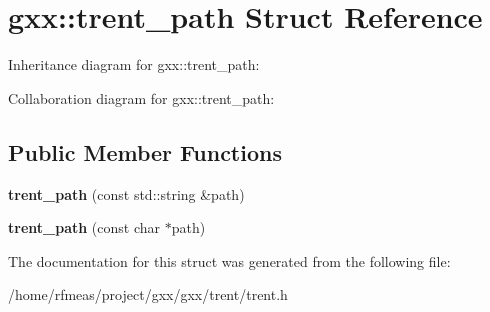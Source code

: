 \hypertarget{structgxx_1_1trent__path}{}\section{gxx\+:\+:trent\+\_\+path Struct Reference}
\label{structgxx_1_1trent__path}


Inheritance diagram for gxx\+:\+:trent\+\_\+path\+:


Collaboration diagram for gxx\+:\+:trent\+\_\+path\+:
\subsection*{Public Member Functions}
\begin{DoxyCompactItemize}
\item 
{\bfseries trent\+\_\+path} (const std\+::string \&path)\hypertarget{structgxx_1_1trent__path_a9588bdc54d56b3c5b96a43af16f724fa}{}\label{structgxx_1_1trent__path_a9588bdc54d56b3c5b96a43af16f724fa}

\item 
{\bfseries trent\+\_\+path} (const char $\ast$path)\hypertarget{structgxx_1_1trent__path_a2116856641019d321a8f0527ca8b5919}{}\label{structgxx_1_1trent__path_a2116856641019d321a8f0527ca8b5919}

\end{DoxyCompactItemize}


The documentation for this struct was generated from the following file\+:\begin{DoxyCompactItemize}
\item 
/home/rfmeas/project/gxx/gxx/trent/trent.\+h\end{DoxyCompactItemize}
